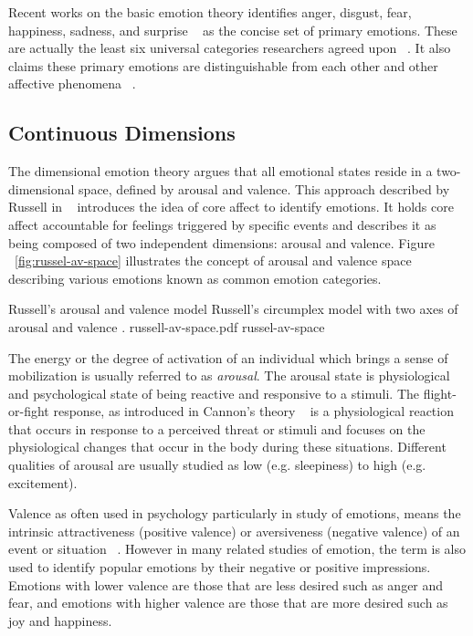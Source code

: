 Recent works on the basic emotion theory identifies anger, disgust, fear, happiness, sadness, and surprise ~\cite{peter2006emotion} as the concise set of primary emotions. These are actually the least six universal categories researchers agreed upon ~\cite{zagalo2004story}. It also claims these primary emotions are distinguishable from each other and other affective phenomena ~\cite{dalgleish1999handbook}.

\subsection{Continuous Dimensions}

The dimensional emotion theory argues that all emotional states reside in a two-dimensional space, defined by arousal and valence. This approach described by Russell in ~\cite{russell2003core} introduces the idea of core affect to identify emotions. It holds core affect accountable for feelings triggered by specific events and describes it as being composed of two independent dimensions: arousal and valence. Figure ~\ref{fig:russel-av-space} illustrates the concept of arousal and valence space describing various emotions known as common emotion categories.

\img
{Russell's arousal and valence model}
{Russell's circumplex model with two axes of arousal and valence \footnotemark.}
{russell-av-space.pdf}
{russel-av-space}

The energy or the degree of activation of an individual which brings a sense of mobilization is usually referred to as \textit{arousal}. The arousal state is physiological and psychological state of being reactive and responsive to a stimuli. The flight-or-fight response, as introduced in Cannon's theory ~\cite{stern2001psychophysiological} is a physiological reaction that occurs in response to a perceived threat or stimuli and focuses on the physiological changes that occur in the body during these situations. Different qualities of arousal are usually studied as low (e.g. sleepiness) to high (e.g. excitement).

Valence as often used in psychology particularly in study of emotions, means the intrinsic attractiveness (positive valence) or aversiveness (negative valence) of an event or situation ~\cite{frijda1986emotions}. However in many related studies of emotion, the term is also used to identify popular emotions by their negative or positive impressions. Emotions with lower valence are those that are less desired such as anger and fear, and emotions with higher valence are those that are more desired such as joy and happiness.

